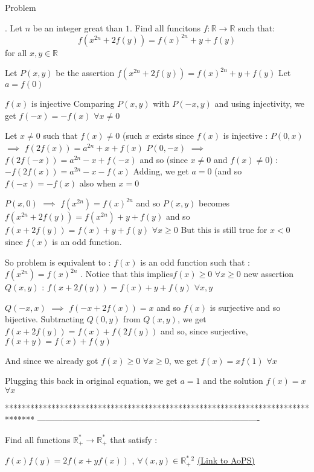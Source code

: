 \begin{solution}
	\begin{tcolorbox}\begin{bolded}Problem\end{bolded}. Let $n$ be an integer great than $1$. Find all funcitons $f:\mathbb{R}\rightarrow \mathbb{R}$ such that: \[f(x^{2n}+2f(y))=f(x)^{2n}+y+f(y)\] for all $x,y\in \mathbb{R}$\end{tcolorbox}
Let $P(x,y)$ be the assertion $f(x^{2n}+2f(y))=f(x)^{2n}+y+f(y)$
Let $a=f(0)$

$f(x)$ is injective
Comparing $P(x,y)$ with $P(-x,y)$ and using injectivity, we get $f(-x)=-f(x)$ $\forall x\ne 0$

Let $x\ne 0$ such that $f(x)\ne 0$ (such $x$ exists since $f(x)$ is injective :
$P(0,x)$ $\implies$ $f(2f(x))=a^{2n}+x+f(x)$
$P(0,-x)$ $\implies$ $f(2f(-x))=a^{2n}-x+f(-x)$ and so (since $x\ne 0$ and $f(x)\ne 0$) : $-f(2f(x))=a^{2n}-x-f(x)$
Adding, we get $a=0$ (and so $f(-x)=-f(x)$ also when $x=0$

$P(x,0)$ $\implies$ $f(x^{2n})=f(x)^{2n}$ and so $P(x,y)$ becomes $f(x^{2n}+2f(y))=f(x^{2n})+y+f(y)$ and so $f(x+2f(y))=f(x)+y+f(y)$ $\forall x\ge 0$
But this is still true for $x<0$ since $f(x)$ is an odd function.

So problem is equivalent to :
$f(x)$ is an odd function such that :
$f(x^{2n})=f(x)^{2n}$ . Notice that this implies$ f(x)\ge 0$ $\forall x\ge 0$
new assertion $Q(x,y)$ : $f(x+2f(y))=f(x)+y+f(y)$ $\forall x,y$

$Q(-x,x)$ $\implies$ $f(-x+2f(x))=x$ and so $f(x)$ is surjective and so bijective.
Subtracting $Q(0,y)$ from $Q(x,y)$, we get  $f(x+2f(y))=f(x)+f(2f(y))$ and so, since surjective, $f(x+y)=f(x)+f(y)$

And since we already got $f(x)\ge 0$ $\forall x\ge 0$, we get $f(x)=xf(1)$ $\forall x$

Plugging this back in original equation, we get $a=1$ and the solution $\boxed{f(x)=x}$ $\forall x$
\end{solution}
*******************************************************************************
-------------------------------------------------------------------------------

\begin{problem}
	Find all functions $ \mathbb{R}^*_+ \to  \mathbb{R}^*_+ $ that satisfy  : 

$f(x)f(y)=2f(x+yf(x))$ , $\forall (x,y) \in \mathbb{R}^*_+ ^2$
	\flushright \href{https://artofproblemsolving.com/community/c6h561575}{(Link to AoPS)}
\end{problem}



